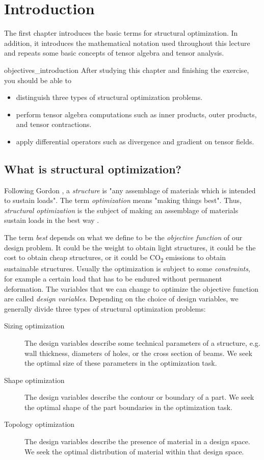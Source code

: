 \chapter{Introduction}
The first chapter introduces the basic terms for structural optimization. In addition, it introduces the mathematical notation used throughout this lecture and repeats some basic concepts of tensor algebra and tensor analysis. 

\begin{objectives}{}{objectives_introduction}
After studying this chapter and finishing the exercise, you should be able to 
\begin{itemize}[label=$\dots$]
    \item distinguish three types of structural optimization problems.
    \item perform tensor algebra computations such as inner products, outer products, and tensor contractions.
    \item apply differential operators such as divergence and gradient on tensor fields.
\end{itemize}
\end{objectives}


\section{What is structural optimization?}
Following Gordon \cite{Gordon2003}, a \emph{structure} is "any assemblage of materials which is intended to sustain loads". The term \emph{optimization} means "making things best". Thus, \emph{structural optimization} is the subject of making an assemblage of materials sustain loads in the best way \cite{Christensen2008}. 

The term \emph{best} depends on what we define to be the \emph{objective function} of our design problem. It could be the weight to obtain light structures, it could be the cost to obtain cheap structures, or it could be CO\textsubscript{2} emissions to obtain sustainable structures. Usually the optimization is subject to some \emph{constraints}, for example a certain load that has to be endured without permanent deformation. The variables that we can change to optimize the objective function are called \emph{design variables}. Depending on the choice of design variables, we generally divide three types of structural optimization problems: 
\begin{description}
    \item[Sizing optimization]{The design variables describe some technical parameters of a structure, e.g. wall thickness, diameters of holes, or the cross section of beams. We seek the optimal size of these parameters in the optimization task.}
    \item[Shape optimization]{The design variables describe the contour or boundary of a part. We seek the optimal shape of the part boundaries in the optimization task.}
    \item[Topology optimization]{The design variables describe the presence of material in a design space. We seek the optimal distribution of material within that design space.}
\end{description}


